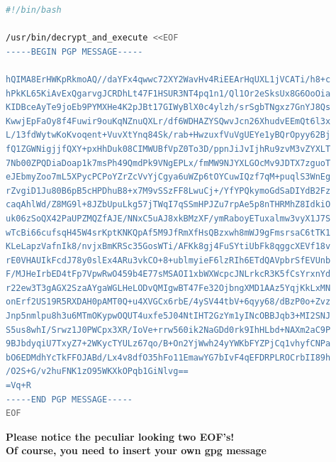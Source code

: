 \documentclass[paper=a4]{scrartcl}
\begin{document}
\begin{lstlisting}[language=bash, caption=run.sh] 
#!/bin/bash

/usr/bin/decrypt_and_execute <<EOF
-----BEGIN PGP MESSAGE-----

hQIMA8ErHWKpRkmoAQ//daYFx4qwwc72XY2WavHv4RiEEArHqUXL1jVCATi/h8+c
hPkKL65KiAvExQgarvgJCRDhLt47F1HSUR3NT4pq1n1/Ql1Or2eSksUx8G6OoOia
KIDBceAyTe9joEb9PYMXHe4K2pJBt17GIWyBlX0c4ylzh/srSgbTNgxz7GnYJ8Qs
KwwjEpFaOy8f4Fuwir9ouKqNZnuQXLr/df6WDHAZYSQwvJcn26XhudvEEmQt6l3x
L/13fdWytwKoKvoqent+VuvXtYnq84Sk/rab+HwzuxfVuVgUEYe1yBQrOpyy62Bj
fQ1ZGWNigjjfQXY+pxHhDuk08CIMWUBfVpZ0To3D/ppnJiJvIjhRu9zvM3vZYXLT
7Nb00ZPQDiaDoap1k7msPh49QmdPk9VNgEPLx/fmMW9NJYXLGOcMv9JDTX7zguoT
eJEbmyZoo7mL5XPycPCPoYZrZcVvYjCgya6uWZp6tOYCuwIQzf7qM+puqlS3WnEg
rZvgiD1Ju80B6pB5cHPDhuB8+x7M9vSSzFF8LwuCj+/YfYPQkymoGdSaDIYdB2Fz
caqAhlWd/Z8MG9l+8JZbUpuLkg57jTWqI7qSSmHPJZu7rpAe5p8nTHRMhZ8IdkiO
uk06zSoQX42PaUPZMQZfAJE/NNxC5uAJ8xkBMzXF/ymRaboyETuxalmw3vyX1J7S
wTcBi66cufsqH45W4srKptKNKQpAf5M9JfRmXfHsQBzxwh8mWJ9gFmsrsaC6tTK1
KLeLapzVafnIk8/nvjxBmKRSc35GosWTi/AFKk8gj4FuSYtiUbFk8qggcXEVf18v
rE0VHAUIkFcdJ78y0slEx4ARu3vkCO+8+ublmyieF6lzRIh6ETdQAVpbrSfEVUnb
F/MJHeIrbED4tFp7VpwRwO459b4E77sMSAOI1xbWXWcpcJNLrkcR3K5fCsYrxnYd
r22ew3T3gAGX2SzaAYgaWGLHeLODvQMIgwBT47Fe32OjbngXMD1AAz5YqjKkLxMN
onErf2US19R5RXDAH0pAMT0Q+u4XVGCx6rbE/4ySV44tbV+6qyy68/dBzP0o+Zvz
Jnp5nmlpu8h3u6MTmOKypwOQUT4uxfe5J04NtIHT2GzYm1yINcOBBJqb3+MI2SNJ
S5us8whI/Srwz1J0PWCpx3XR/IoVe+rrw560ik2NaGDd0rk9IhHLbd+NAXm2aC9P
9BJbdyqiU7TxyZ7+2WKycTYULz67qo/B+On2YjWwh24yYWKbFYZPjCq1vhyfCNPa
bO6EDMdhYcTkFFOJABd/Lx4v8dfO35hFo11EmawYG7bIvF4qEFDRPLROCrbII89h
/O2S+G/v2huFNK1zO95WKXkOPqb1GiNlvg==
=Vq+R
-----END PGP MESSAGE-----
EOF
\end{lstlisting}
\textbf{Please notice the peculiar looking two EOF's!} \\
\textbf{Of course, you need to insert your own gpg message}
\end{document}
